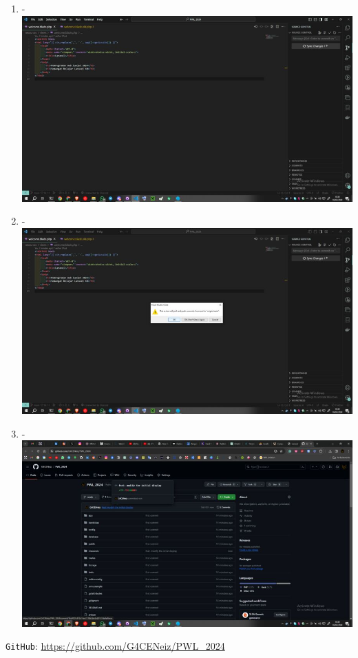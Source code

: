 \documentclass[12pt,titlepage]{article}
\begin{document}
\begin{enumerate}[label= \alph*.]
    \item - \\ \includegraphics[width=.9\textwidth]{images/figures/Source Control 4.jpg}
    \newpage
    \item - \\ \includegraphics[width=.9\textwidth]{images/figures/Source Control 5.jpg}
    \item - \\ \includegraphics[width=.9\textwidth]{images/figures/Source Control 6.jpg}
\end{enumerate}

\texttt{GitHub}: \url{https://github.com/G4CENeiz/PWL_2024}
\end{document}
